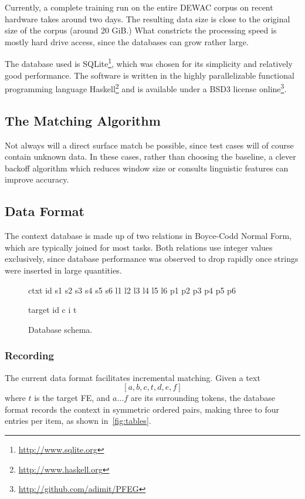 \documentclass[12pt]{article}
\begin{document}
Currently, a complete training run on the entire DEWAC corpus on recent hardware
takes around two days.  The resulting data size is close to the original size of
the corpus (around 20 GiB.) What constricts the processing speed is mostly hard
drive access, since the databases can grow rather large.

The database used is SQLite\footnote{\url{http://www.sqlite.org}}, which was chosen for its
simplicity and relatively good performance. The software is written
in the highly parallelizable functional programming language
Haskell\footnote{\url{http://www.haskell.org}} and is available under a BSD3
license online\footnote{\url{http://github.com/adimit/PFEG}}.

\subsection{The Matching Algorithm}

Not always will a direct surface match be possible, since test cases will of
course contain unknown data. In these cases, rather than choosing the baseline,
a clever backoff algorithm which reduces window size or consults linguistic
features can improve accuracy.

\subsection{Data Format}

The context database is made up of two relations in Boyce-Codd Normal Form,
which are typically joined for most tasks. Both relations use integer values
exclusively, since database performance was observed to drop rapidly once
strings were inserted in large quantities.

\begin{figure}
ctxt id s1 s2 s3 s4 s5 s6 l1 l2 l3 l4 l5 l6 p1 p2 p3 p4 p5 p6

target id c i t
\caption{Database schema.}
\end{figure}

\subsubsection{Recording}

   The current data format facilitates incremental matching.
   Given a text \[[a,b,c,t,d,e,f]\] where $t$ is the target FE, and $a\ldots{}f$ are its
   surrounding tokens, the database format records the context in symmetric
   ordered pairs, making three to four entries per item, as shown
   in~\ref{fig:tables}.
\end{document}
